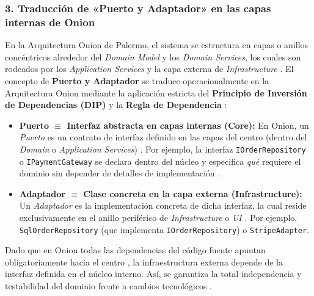 \subsubsection*{3. Traducción de «Puerto y Adaptador» en las capas internas de Onion}

En la Arquitectura Onion de Palermo, el sistema se estructura en capas o anillos concéntricos alrededor del \emph{Domain Model} y los \emph{Domain Services}, los cuales son rodeados por los \emph{Application Services} y la capa externa de \emph{Infrastructure} \parencite{palermo2008onion}. El concepto de \textbf{Puerto y Adaptador} se traduce operacionalmente en la Arquitectura Onion mediante la aplicación estricta del \textbf{Principio de Inversión de Dependencias (DIP)} y la \textbf{Regla de Dependencia} \parencite{palermo2008onion,martin2017clean}:

\begin{itemize}
    \item \textbf{Puerto $\equiv$ Interfaz abstracta en capas internas (Core):} En Onion, un \emph{Puerto} es un contrato de interfaz definido en las capas del centro (dentro del \emph{Domain} o \emph{Application Services}) \parencite{palermo2008onion,cockburn2005hexagonal}. Por ejemplo, la interfaz \texttt{IOrderRepository} o \texttt{IPaymentGateway} se declara dentro del núcleo y especifica \emph{qué} requiere el dominio sin depender de detalles de implementación \parencite{palermo2008onion}.
    \item \textbf{Adaptador $\equiv$ Clase concreta en la capa externa (Infrastructure):} Un \emph{Adaptador} es la implementación concreta de dicha interfaz, la cual reside exclusivamente en el anillo periférico de \emph{Infrastructure} o \emph{UI} \parencite{palermo2008onion,cockburn2005hexagonal}. Por ejemplo, \texttt{SqlOrderRepository} (que implementa \texttt{IOrderRepository}) o \texttt{StripeAdapter}.
\end{itemize}

Dado que en Onion todas las dependencias del código fuente apuntan obligatoriamente hacia el centro \parencite{palermo2008onion}, la infraestructura externa depende de la interfaz definida en el núcleo interno. Así, se garantiza la total independencia y testabilidad del dominio frente a cambios tecnológicos \parencite{palermo2008onion,martin2017clean}.

